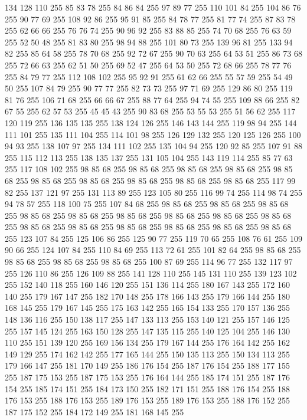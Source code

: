 134 128 110 255 85 83 78 255 84 86 84 255 97 89 77 255 110 101 84 255 104 86 76 255 90 77 69 255 108 92 86 255 95 91 85 255 84 78 77 255 81 77 74 255 87 83 78 255 62 66 66 255 76 76 74 255 90 96 92 255 83 88 85 255 74 70 68 255 76 63 59 255 52 50 48 255 81 83 80 255 98 94 88 255 101 80 73 255 139 96 81 255 133 94 82 255 85 64 58 255 78 70 68 255 92 72 67 255 90 70 63 255 64 53 51 255 86 73 68 255 72 66 63 255 62 51 50 255 69 52 47 255 64 53 50 255 72 68 66 255 78 77 76 255 84 79 77 255 112 108 102 255 95 92 91 255 61 62 66 255 55 57 59 255 54 49 50 255 107 84 79 255 90 77 77 255 82 73 73 255 97 71 69 255 129 86 80 255 119 81 76 255 106 71 68 255 66 66 67 255 88 77 64 255 94 74 55 255 109 88 66 255 82 67 55 255 62 57 53 255 45 45 43 255 90 83 68 255 53 55 53 255 51 56 62 255 117 120 119 255 136 135 135 255 138 124 126 255 146 143 144 255 119 98 94 255
144 111 101 255 135 111 104 255 114 101 98 255 126 129 132 255 120 125 126 255 100 94 93 255 138 107 97 255 134 111 102 255 135 104 94 255 120 92 85 255 107 91 88 255 115 112 113 255 138 135 137 255 131 105 104 255 143 119 114 255 85 77 63 255 117 108 102 255 98 85 68 255 98 85 68 255 98 85 68 255 98 85 68 255 98 85 68 255 98 85 68 255 98 85 68 255 98 85 68 255 98 85 68 255 98 85 68 255 117 99 82 255 137 121 97 255 131 113 89 255 123 105 80 255 116 99 74 255 114 98 74 255 94 78 57 255 118 100 75 255 107 84 68 255 98 85 68 255 98 85 68 255 98 85 68 255 98 85 68 255 98 85 68 255 98 85 68 255 98 85 68 255 98 85 68 255 98 85 68 255 98 85 68 255 98 85 68 255 98 85 68 255 98 85 68 255 98 85 68 255 98 85 68 255 123 107 84 255 125 106 86 255 125 90 77 255 119 70 65 255 108 76 61 255 109 90 66 255 124 107 84 255 110 84 69 255 113 72 61 255 101 82 64 255 98 85 68 255 98 85 68 255 98 85 68 255
98 85 68 255 100 87 69 255 114 96 77 255 132 117 97 255 126 110 86 255 126 109 88 255 141 128 110 255 145 131 110 255 139 123 102 255 152 140 118 255 160 146 120 255 151 136 114 255 180 167 143 255 172 160 140 255 179 167 147 255 182 170 148 255 178 166 143 255 179 166 144 255 180 168 145 255 179 167 145 255 175 163 142 255 165 154 133 255 170 157 136 255 148 136 116 255 150 138 117 255 147 133 113 255 153 140 121 255 157 146 125 255 157 145 124 255 163 150 128 255 147 135 115 255 140 125 104 255 146 130 110 255 151 139 120 255 169 156 134 255 179 167 144 255 176 164 142 255 162 149 129 255 174 162 142 255 177 165 144 255 150 135 113 255 150 134 113 255 179 166 147 255 181 170 149 255 186 176 154 255 187 176 154 255 188 177 155 255 187 175 153 255 187 175 153 255 176 164 144 255 185 174 151 255 187 176 154 255 185 174 151 255 184 173 150 255 182 171 151 255 188 176 154 255 188 176 153 255 188 176 153 255 189 176 153 255 189 176 153 255 188 176 152 255 187 175 152 255 184 172 149 255 181 168 145 255
